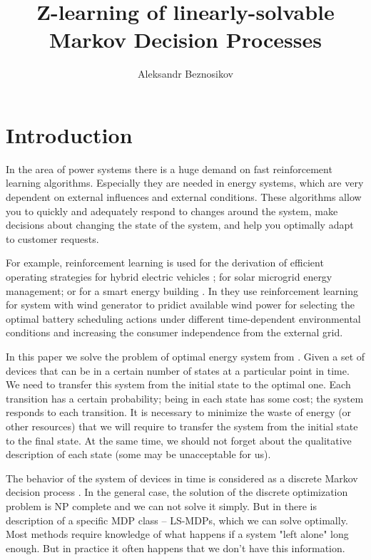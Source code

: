 \documentclass[12pt,twoside]{article}
\title
    [Z-learning of linearly-solvable Markov Decision Processes] %
    {Z-learning of linearly-solvable Markov Decision Processes}
\author
    [Aleksandr Beznosikov] %
    {Aleksandr Beznosikov} %
    [Aleksandr Beznosikov$^1$]
\begin{document}
\English
\maketitle

\section{Introduction} 

In the area of power systems there is a huge demand on fast reinforcement learning algorithms. Especially they are needed in energy systems, which are very dependent on external influences and external conditions. These algorithms allow you to quickly and adequately respond to changes around the system, make decisions about changing the state of the system, and help you optimally adapt to customer requests. 

For example, reinforcement learning is used for the derivation of efficient operating strategies for hybrid electric vehicles \cite{Liessner}; for solar microgrid energy management\cite{Raju}; or for a smart energy building \cite{Kim}. In \cite{Ruiz} they use reinforcement learning for system with wind generator to pridict available wind power for selecting the optimal battery scheduling actions under different time-dependent environmental conditions and increasing the consumer independence from the external grid. 

In this paper we solve the problem of optimal energy system from \cite{Chertkov}. Given a set of devices that can be in a certain number of states at a particular point in time. We need to transfer this system from the initial state to the optimal one. Each transition has a certain probability; being in each state has some cost; the system responds to each transition. It is necessary to minimize the waste of energy (or other resources) that we will require to transfer the system from the initial state to the final state. At the same time, we should not forget about the qualitative description of each state (some may be unacceptable for us).

The behavior of the system of devices in time is considered as a discrete Markov decision process \cite{Durrett}. In the general case, the solution of the discrete optimization problem is NP complete \cite{Korte} and we can not solve it simply. But in \cite{Todorov} there is description of a specific MDP class -- LS-MDPs, which we can solve optimally. Most methods require knowledge of what happens if a system "left alone" long enough. But in practice it often happens that we don't have this information.
\end{document}
